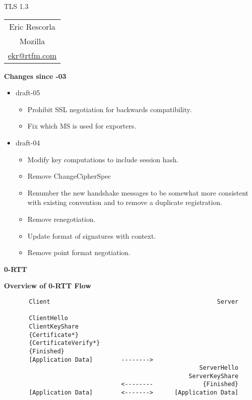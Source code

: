\documentclass[helvetica]{seminar}
\newcommand{\heading}[1]{%
  \begin{center} 
    \large\bf 
    #1 
  \end{center} 
  \vspace{.4 in}}
\begin{document}
\begin{slide}
\begin{center}
\vspace{.5 in}
\LARGE{{\bf}TLS 1.3}\\
\vspace{.2in}
\large{
\begin{tabular}{c}
Eric Rescorla\\
Mozilla\\
\url{ekr@rtfm.com}
\end{tabular}
}
\end{center}

\end{slide}

\centerslidesfalse 


\begin{slide}
\heading{Changes since -03}

\vspace{-.25in}
\begin{itemize}
\item draft-05
  \begin{itemize}
  \item Prohibit SSL negotiation for backwards compatibility.
  \item Fix which MS is used for exporters.
  \end{itemize}

\item draft-04
  \begin{itemize}
  \item Modify key computations to include session hash.
  \item Remove ChangeCipherSpec
  \item Renumber the new handshake messages to be somewhat more
    consistent with existing convention and to remove a duplicate
    registration.
  \item Remove renegotiation.
  \item Update format of signatures with context.
  \item Remove point format negotiation.
  \end{itemize}  
\end{itemize}
\end{slide}


\begin{slide}
\heading{0-RTT}
\end{slide}


\begin{slide}
\heading{Overview of 0-RTT Flow}

{\scriptsize
\begin{verbatim}
       Client                                               Server

       ClientHello
       ClientKeyShare
       {Certificate*}
       {CertificateVerify*}
       {Finished}              
       [Application Data]        -------->
                                                       ServerHello
                                                    ServerKeyShare
                                 <--------              {Finished}
       [Application Data]        <------->      [Application Data]
\end{verbatim}
}
\end{slide}
\end{document}
